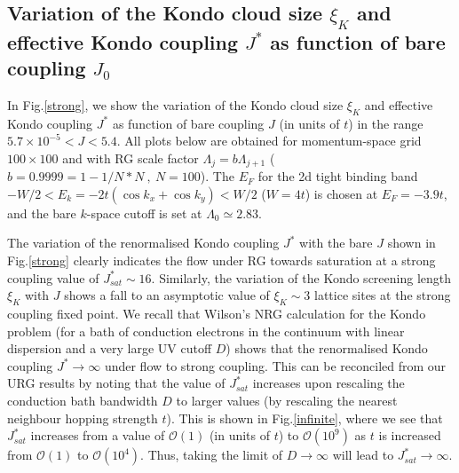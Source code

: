 \documentclass[aps,prb,preprint,groupedaddress]{revtex4-2}
\begin{document}
\subsection{Variation of the Kondo cloud size $\xi_{K}$ and effective Kondo coupling $J^{*}$ as function of bare coupling $J_{0}$}
In Fig.\ref{strong}, we show the variation of the Kondo cloud size $\xi_{K}$ and effective Kondo coupling $J^{*}$ as function of bare coupling $J$ (in units of $t$) in the range $5.7\times 10^{-5}<J<5.4$.
All plots below are obtained for momentum-space grid $100\times 100$ and with RG scale factor $\Lambda_{j}=b\Lambda_{j+1}$ ($b=0.9999 = 1-1/N*N~,~N=100$). The $E_{F}$ for the 2d tight binding band $-W/2<E_{k}=-2t(\cos k_{x}+\cos k_{y})<W/2$ ($W=4t$) is chosen at $E_{F}=-3.9t$, and the bare $k$-space cutoff is set at $\Lambda_{0}\simeq 2.83$. 
\par\noindent
The variation of the renormalised Kondo coupling $J^{*}$ with the bare $J$ shown in Fig.\ref{strong} clearly indicates the flow under RG towards saturation at a strong coupling value of $J^{*}_{sat}\sim 16$. Similarly, the variation of the Kondo screening length $\xi_{K}$ with $J$ shows a fall to an asymptotic value of $\xi_{K}\sim 3$ lattice sites at the strong coupling fixed point.
We recall that Wilson's NRG calculation for the Kondo problem (for a bath of conduction electrons in the continuum with linear dispersion and a very large UV cutoff $D$) shows that the renormalised Kondo coupling $J^{*}\to\infty$ under flow to strong coupling. This can be reconciled from our URG results by noting that the value of $J^{*}_{sat}$ increases upon rescaling the conduction bath bandwidth $D$ to larger values (by rescaling the nearest neighbour hopping strength $t$). This is shown in Fig.\ref{infinite}, where we see that $J^{*}_{sat}$ increases from a value of $\mathcal{O}(1)$ (in units of $t$) to $\mathcal{O}(10^{9})$ as $t$ is increased from $\mathcal{O}(1)$ to $\mathcal{O}(10^{4})$. Thus, taking the limit of $D\to\infty$ will lead to $J^{*}_{sat}\to\infty$. 
\end{document}
